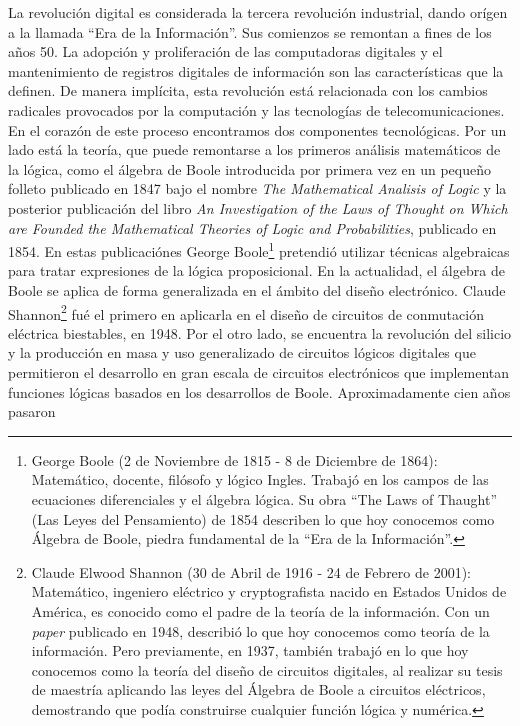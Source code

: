 La revolución digital es considerada la tercera revolución industrial, dando
orígen a la llamada ``Era de la Información''. Sus comienzos se remontan a fines
de los años 50. La adopción y proliferación de las computadoras digitales y el
mantenimiento de registros digitales de información son las características que
la definen. De manera implícita, esta revolución está relacionada con los
cambios radicales provocados por la computación y las tecnologías de
telecomunicaciones. En el corazón de este proceso encontramos dos componentes
tecnológicas. Por un lado está la teoría, que puede remontarse a los primeros
análisis matemáticos de la lógica, como el álgebra de Boole introducida por
primera vez en un pequeño folleto publicado en 1847 bajo el nombre \emph{The
Mathematical Analisis of Logic} y la posterior publicación del libro \emph{An
Investigation of the Laws of Thought on Which are Founded the Mathematical
Theories of Logic and Probabilities}, publicado en 1854. En estas publicaciónes
George Boole\footnote{George Boole (2 de Noviembre de 1815 - 8 de Diciembre de
1864): Matemático, docente, filósofo y lógico Ingles. Trabajó en los campos de
las ecuaciones diferenciales y el álgebra lógica. Su obra ``The Laws of
Thaught'' (Las Leyes del Pensamiento) de 1854 describen lo que hoy conocemos
como Álgebra de Boole, piedra fundamental de la ``Era de la Información''.}
pretendió utilizar técnicas algebraicas para tratar expresiones de la lógica
proposicional. En la actualidad, el álgebra de Boole se aplica de forma
generalizada en el ámbito del diseño electrónico. Claude Shannon\footnote{Claude
Elwood Shannon (30 de Abril de 1916 - 24 de Febrero de 2001): Matemático,
ingeniero eléctrico y cryptografista nacido en Estados Unidos de América, es
conocido como el padre de la teoría de la información. Con un \emph{paper}
publicado en 1948, describió lo que hoy conocemos como teoría de la información.
Pero previamente, en 1937, también trabajó en lo que hoy conocemos como la
teoría del diseño de circuitos digitales, al realizar su tesis de maestría
aplicando las leyes del Álgebra de Boole a circuitos eléctricos, demostrando que
podía construirse cualquier función lógica y numérica.} fué el primero en
aplicarla en el diseño de circuitos de conmutación eléctrica biestables, en
1948. Por el otro lado, se encuentra la revolución del silicio y la producción
en masa y uso generalizado de circuitos lógicos digitales que permitieron el
desarrollo en gran escala de circuitos electrónicos que implementan funciones
lógicas basados en los desarrollos de Boole. Aproximadamente cien años pasaron
